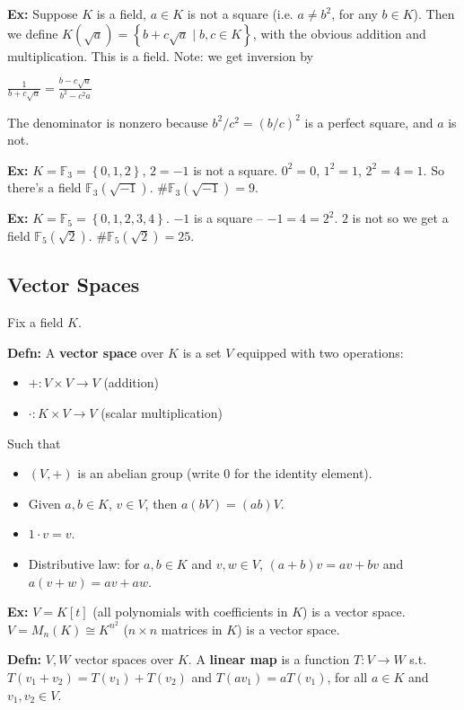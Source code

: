 \documentclass[10pt,letterpaper]{article}
\newcommand{\n}{\hfill\break}
\newcommand{\up}{\vspace{-\baselineskip}}
\newcommand{\hangblock}[2]{\par\noindent\settowidth{\hangindent}{\textbf{#1: }}\textbf{#1: }\!\!\!#2}
\newcommand{\defn}[1]{\hangblock{Defn}{#1}}
\newcommand{\ex}[1]{\hangblock{Ex}{#1}}
\newcommand{\inlineeq}[1]{\centerline{$\displaystyle #1$}}
\newcommand{\set}[1]{\left\{#1\right\}}
\newcommand{\F}{\mathbb{F}}
\newcommand{\st}{s.t.}
\begin{document}
\ex{
	Suppose $K$ is a field, $a\in{}K$ is not a square (i.e. $a\ne{}b^{2}$, for any $b\in{}K$). Then we define $K(\sqrt{a})=\set{b+c\sqrt{a}\mid{}b,c\in{}K}$, with the obvious addition and multiplication. This is a field.\n
	Note: we get inversion by\n
	\inlineeq{
		\frac{1}{b+c\sqrt{a}}=\frac{b-c\sqrt{a}}{b^{2}-c^{2}a}
	}
	The denominator is nonzero because $b^{2}/c^{2}=(b/c)^{2}$ is a perfect square, and $a$ is not.\n
}

\ex{
	$K=\mathbb{F}_{3}=\set{0,1,2}$, $2=-1$ is not a square. $0^{2}=0$, $1^{2}=1$, $2^{2}=4=1$. So there's a field $\mathbb{F}_{3}(\sqrt{-1})$. $\#\mathbb{F}_{3}(\sqrt{-1})=9$.\n
}

\ex{
	$K=\F_{5}=\set{0,1,2,3,4}$. $-1$ is a square -- $-1=4=2^{2}$. $2$ is not so we get a field $\F_{5}(\sqrt{2})$.\n
	$\#\F_{5}(\sqrt{2})=25$.\n
}

\subsection*{Vector Spaces}

\par\noindent
Fix a field $K$.\n

\defn{
	A \textbf{vector space} over $K$ is a set $V$ equipped with two operations:
	\begin{itemize}
		\item $+:V\times{}V\to{}V$ (addition)
		\item $\cdot:K\times{}V\to{}V$ (scalar multiplication)
	\end{itemize}\up\n
	Such that
	\begin{itemize}
		\item $(V,+)$ is an abelian group (write $0$ for the identity element).
		\item Given $a,b\in{}K$, $v\in{}V$, then $a(bV)=(ab)V$.
		\item $1\cdot{}v=v$.
		\item Distributive law: for $a,b\in{}K$ and $v,w\in{}V$, $(a+b)v=av+bv$ and $a(v+w)=av+aw$.
	\end{itemize}\up\n
}

\ex{
	$V=K[t]$ (all polynomials with coefficients in $K$) is a vector space.\n
	$V=M_{n}(K)\cong{}K^{n^{2}}$ ($n\times{}n$ matrices in $K$) is a vector space.\n
}

\defn{
	$V,W$ vector spaces over $K$. A \textbf{linear map} is a function $T:V\to{}W$ \st{} $T(v_{1}+v_{2})=T(v_{1})+T(v_{2})$ and $T(av_{1})=aT(v_{1})$, for all $a\in{}K$ and $v_{1},v_{2}\in{}V$.\n
}
\end{document}
